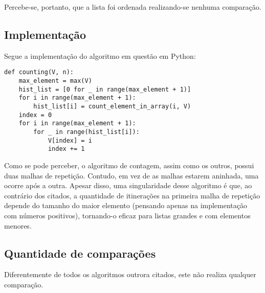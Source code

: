 Percebe-se, portanto, que a lista foi ordenada realizando-se nenhuma comparação.

\subsection{Implementação}
Segue a implementação do algoritmo em questão em Python:

\begin{lstlisting}
def counting(V, n):
    max_element = max(V)
    hist_list = [0 for _ in range(max_element + 1)]
    for i in range(max_element + 1):
        hist_list[i] = count_element_in_array(i, V)
    index = 0
    for i in range(max_element + 1):
        for _ in range(hist_list[i]):
            V[index] = i
            index += 1
\end{lstlisting}
Como se pode perceber, o algoritmo de contagem, assim como os outros, possui duas malhas de repetição. Contudo, em vez de as malhas estarem aninhada, uma ocorre após a outra.
Apesar disso, uma singularidade desse algoritmo é que, ao contrário dos citados, a quantidade de itinerações na primeira malha de repetição depende do tamanho do maior elemento (pensando apenas na implementação com números positivos), tornando-o eficaz para listas grandes e com elementos menores.

\subsection{Quantidade de comparações}
Diferentemente de todos os algoritmos outrora citados, este não realiza qualquer comparação.